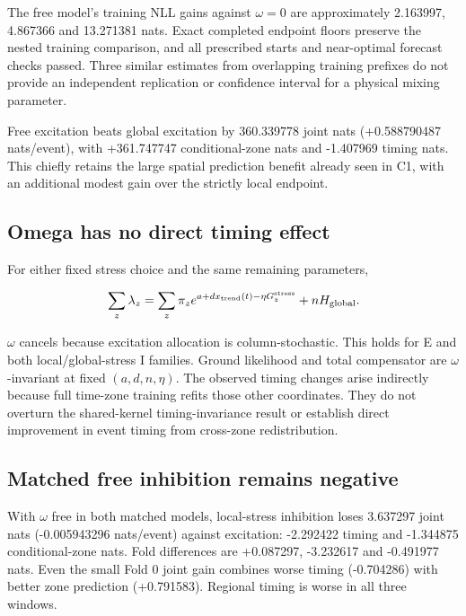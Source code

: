 The free model's training NLL gains against $\omega=0$ are approximately 2.163997, 4.867366 and 13.271381 nats. Exact completed endpoint floors preserve the nested training comparison, and all prescribed starts and near-optimal forecast checks passed. Three similar estimates from overlapping training prefixes do not provide an independent replication or confidence interval for a physical mixing parameter.

Free excitation beats global excitation by 360.339778 joint nats (+0.588790487 nats/event), with +361.747747 conditional-zone nats and -1.407969 timing nats. This chiefly retains the large spatial prediction benefit already seen in C1, with an additional modest gain over the strictly local endpoint.

\subsection{Omega has no direct timing effect}

For either fixed stress choice and the same remaining parameters,

\begin{equation}\sum_z\lambda_z=\sum_z\pi_z e^{a+d x_{\mathrm{trend}}(t)-\eta G_z^{\rm stress}}+nH_{\rm global}.\end{equation}

$\omega$ cancels because excitation allocation is column-stochastic. This holds for E and both local/global-stress I families. Ground likelihood and total compensator are $\omega$-invariant at fixed $(a,d,n,\eta)$. The observed timing changes arise indirectly because full time-zone training refits those other coordinates. They do not overturn the shared-kernel timing-invariance result or establish direct improvement in event timing from cross-zone redistribution.

\subsection{Matched free inhibition remains negative}

With $\omega$ free in both matched models, local-stress inhibition loses 3.637297 joint nats (-0.005943296 nats/event) against excitation: -2.292422 timing and -1.344875 conditional-zone nats. Fold differences are +0.087297, -3.232617 and -0.491977 nats. Even the small Fold 0 joint gain combines worse timing (-0.704286) with better zone prediction (+0.791583). Regional timing is worse in all three windows.

